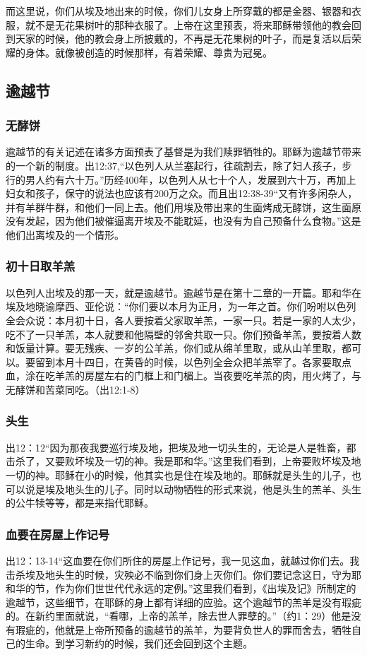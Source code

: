 而这里说，你们从埃及地出来的时候，你们儿女身上所穿戴的都是金器、银器和衣服，就不是无花果树叶的那种衣服了。上帝在这里预表，将来耶稣带领他的教会回到天家的时候，他的教会身上所披戴的，不再是无花果树的叶子，而是复活以后荣耀的身体。就像被创造的时候那样，有着荣耀、尊贵为冠冕。


\subsection{逾越节}
\subsubsection{无酵饼}
逾越节的有关记述在诸多方面预表了基督是为我们赎罪牺牲的。耶稣为逾越节带来的一个新的制度。出12:37,“以色列人从兰塞起行，往疏割去，除了妇人孩子，步行的男人约有六十万。”历经400年，以色列人从七十个人，发展到六十万，再加上妇女和孩子，保守的说法也应该有200万之众。而且出12:38-39“又有许多闲杂人，并有羊群牛群，和他们一同上去。他们用埃及带出来的生面烤成无酵饼，这生面原没有发起，因为他们被催逼离开埃及不能耽延，也没有为自己预备什么食物。”这是他们出离埃及的一个情形。



\subsubsection{初十日取羊羔}
以色列人出埃及的那一天，就是逾越节。逾越节是在第十二章的一开篇。耶和华在埃及地晓谕摩西、亚伦说：“你们要以本月为正月，为一年之首。你们吩咐以色列全会众说：本月初十日，各人要按着父家取羊羔，一家一只。若是一家的人太少，吃不了一只羊羔，本人就要和他隔壁的邻舍共取一只。你们预备羊羔，要按着人数和饭量计算。要无残疾、一岁的公羊羔，你们或从绵羊里取，或从山羊里取，都可以。要留到本月十四日，在黄昏的时候，以色列全会众把羊羔宰了。各家要取点血，涂在吃羊羔的房屋左右的门框上和门楣上。当夜要吃羊羔的肉，用火烤了，与无酵饼和苦菜同吃。（出12:1-8）

\subsubsection{头生}
出12：12“因为那夜我要巡行埃及地，把埃及地一切头生的，无论是人是牲畜，都击杀了，又要败坏埃及一切的神。我是耶和华。”这里我们看到，上帝要败坏埃及地一切的神。耶稣在小的时候，他其实也是住在埃及地的。耶稣就是头生的儿子，也可以说是埃及地头生的儿子。同时以动物牺牲的形式来说，他是头生的羔羊、头生的公牛犊等等，都是来指代耶稣。


\subsubsection{血要在房屋上作记号}
出12：13-14“这血要在你们所住的房屋上作记号，我一见这血，就越过你们去。我击杀埃及地头生的时候，灾殃必不临到你们身上灭你们。你们要记念这日，守为耶和华的节，作为你们世世代代永远的定例。”这里我们看到，《出埃及记》所制定的逾越节，这些细节，在耶稣的身上都有详细的应验。这个逾越节的羔羊是没有瑕疵的。在新约里面就说，“看哪，上帝的羔羊，除去世人罪孽的。”（约1：29）他是没有瑕疵的，他就是上帝所预备的逾越节的羔羊，为要背负世人的罪而舍去，牺牲自己的生命。到学习新约的时候，我们还会回到这个主题。


